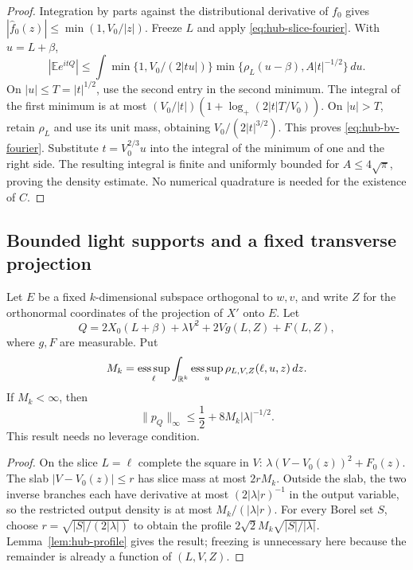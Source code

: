 \begin{proof}
Integration by parts against the distributional derivative of $f_0$
gives $|\widehat f_0(z)|\le\min(1,V_0/|z|)$.
Freeze $L$ and apply \eqref{eq:hub-slice-fourier}.  With $u=L+\beta$,
\[
 |\mathbb E e^{itQ}|\le
 \int\min\{1,V_0/(2|tu|)\}
       \min\{\rho_L(u-\beta),A|t|^{-1/2}\}\,du.
\]
On $|u|\le T=|t|^{1/2}$, use the second entry in the second minimum.
The integral of the first minimum is at most
$(V_0/|t|)(1+\log_+(2|t|T/V_0))$.
On $|u|>T$, retain $\rho_L$ and use its unit mass, obtaining
$V_0/(2|t|^{3/2})$.  This proves
\eqref{eq:hub-bv-fourier}.
Substitute $t=V_0^{2/3}u$ into the integral of the minimum of one and
the right side.  The resulting integral is finite and uniformly
bounded for $A\le4\sqrt\pi$, proving the density estimate.
No numerical quadrature is needed for the existence of $C$.
\end{proof}

\subsection{Bounded light supports and a fixed transverse projection}

\begin{proposition}
\label{prop:hub-maximal-projection}
Let $E$ be a fixed $k$-dimensional subspace orthogonal to $w,v$,
and write $Z$ for the orthonormal coordinates of the projection of
$X'$ onto $E$.  Let
\[
 Q=2X_0(L+\beta)+\lambda V^2+2Vg(L,Z)+F(L,Z),
\]
where $g,F$ are measurable.  Put
\[
 M_k=\mathop{\rm ess\,sup}_{\ell}
            \int_{\mathbb R^k}\mathop{\rm ess\,sup}_u
                       \rho_{L,V,Z}(\ell,u,z)\,dz.
\]
If $M_k<\infty$, then
\[
 \|p_Q\|_\infty\le\frac12+8M_k|\lambda|^{-1/2}.
\]
This result needs no leverage condition.
\end{proposition}

\begin{proof}
On the slice $L=\ell$ complete the square in $V$:
$\lambda(V-V_0(z))^2+F_0(z)$.
The slab $|V-V_0(z)|\le r$ has slice mass at most $2rM_k$.
Outside the slab, the two inverse branches each have derivative
at most $(2|\lambda|r)^{-1}$ in the output variable, so the
restricted output density is at most $M_k/(|\lambda|r)$.
For every Borel set $S$, choose
$r=\sqrt{|S|/(2|\lambda|)}$ to obtain the profile
$2\sqrt2M_k\sqrt{|S|/|\lambda|}$.
Lemma~\ref{lem:hub-profile} gives the result; freezing is unnecessary
here because the remainder is already a function of $(L,V,Z)$.
\end{proof}

